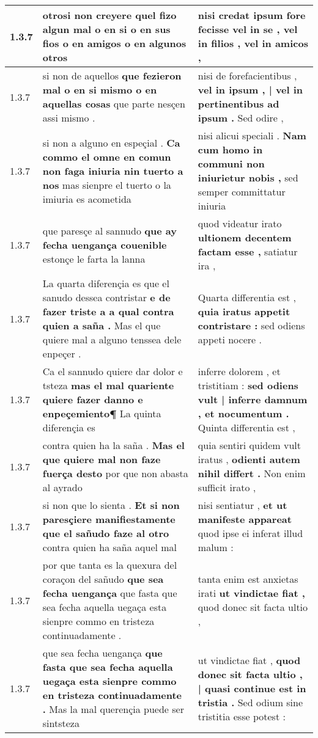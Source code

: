 \begin{tabular}{|p{1cm}|p{6.5cm}|p{6.5cm}|}
1.3.7 & otrosi non creyere \textbf{ quel fizo algun mal } o en si o en sus fios o en amigos o en algunos otros & nisi credat \textbf{ ipsum fore fecisse vel in se , vel in filios , } vel in amicos , \\\hline
1.3.7 & si non de aquellos \textbf{ que fezieron mal o en si mismo o en aquellas cosas } que parte nesçen assi mismo . & nisi de forefacientibus , \textbf{ vel in ipsum , | vel in pertinentibus ad ipsum . } Sed odire , \\\hline
1.3.7 & si non a alguno en espeçial . \textbf{ Ca commo el omne en comun non faga iniuria nin tuerto a nos } mas sienpre el tuerto o la imiuria es acometida & nisi alicui speciali . \textbf{ Nam cum homo in communi non iniurietur nobis , } sed semper committatur iniuria \\\hline
1.3.7 & que paresçe al sannudo \textbf{ que ay fecha uengança couenible } estonçe le farta la lanna & quod videatur irato \textbf{ ultionem decentem factam esse , } satiatur ira , \\\hline
1.3.7 & La quarta diferençia es que el sanudo dessea contristar \textbf{ e de fazer triste a a qual contra quien a saña . } Mas el que quiere mal a alguno tenssea dele enpeçer . & Quarta differentia est , \textbf{ quia iratus appetit contristare : } sed odiens appeti nocere . \\\hline
1.3.7 & Ca el sannudo quiere dar dolor e tsteza \textbf{ mas el mal quariente quiere fazer danno e enpeçemiento¶ } La quinta diferençia es & inferre dolorem , et tristitiam : \textbf{ sed odiens vult | inferre damnum , et nocumentum . } Quinta differentia est , \\\hline
1.3.7 & contra quien ha la saña . \textbf{ Mas el que quiere mal non faze fuerça desto } por que non abasta al ayrado & quia sentiri quidem vult iratus , \textbf{ odienti autem nihil differt . } Non enim sufficit irato , \\\hline
1.3.7 & si non que lo sienta . \textbf{ Et si non paresçiere manifiestamente que el sañudo faze al otro } contra quien ha saña aquel mal & nisi sentiatur , \textbf{ et ut manifeste appareat } quod ipse ei inferat illud malum : \\\hline
1.3.7 & por que tanta es la quexura del coraçon del sañudo \textbf{ que sea fecha uengança } que fasta que sea fecha aquella uegaça esta sienpre commo en tristeza continuadamente . & tanta enim est anxietas irati \textbf{ ut vindictae fiat , } quod donec sit facta ultio , \\\hline
1.3.7 & que sea fecha uengança \textbf{ que fasta que sea fecha aquella uegaça esta sienpre commo en tristeza continuadamente . } Mas la mal querençia puede ser sintsteza & ut vindictae fiat , \textbf{ quod donec sit facta ultio , | quasi continue est in tristia . } Sed odium sine tristitia esse potest : \\\hline

\end{tabular}
